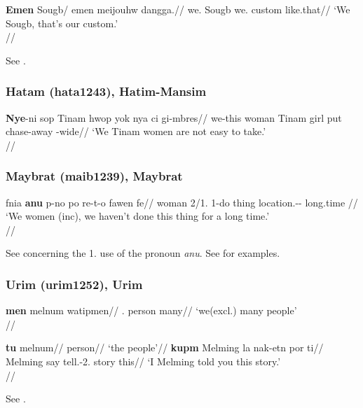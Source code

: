 \documentclass[A4paper]{article}
\begin{document}
\ex 
\begingl
\gla \textbf{Emen} Sougb/ emen meijouhw dangga.//
\glb we.\Excl{} Sougb we.\Excl{} custom like.that//
\glft `We Sougb, that's our custom.' \\\citep[274, (40)]{reesink2002sougb}//
\endgl
\xe 

See \citet[200, 269f., 274]{reesink2002sougb}.

\subsubsection{Hatam (hata1243), Hatim-Mansim}

\ex \begingl
\gla \textbf{Nye}-ni sop Tinam hwop yok nya ci gi-mbres//
\glb we-this woman Tinam girl put \Pl{} chase-away \Nmlz{}-wide//
\glft `We Tinam women are not easy to take.'\\\citep[195, (72)]{reesink1999}//
\endgl
\xe 


\subsubsection{Maybrat (maib1239), Maybrat}

\ex
\begingl
\gla fnia \textbf{anu} p-no po re-t-o fawen fe//
\glb woman 2\Pl/1\Pl.\Incl{} 1\Pl-do thing location.\Spec-\Prox-\Unmark{} long.time \Neg{}//
\glft `We women (inc), we haven't done this thing for a long time.'\\\citep[158, (99)]{dol2007}//
\endgl
\xe

See \citet[64, fn. 5]{dol2007} concerning the 1\Pl.\Incl{} use of the pronoun \emph{anu}.
See \citet[141, 158, 172, (281)]{dol2007} for examples.

\subsubsection{Urim (urim1252), Urim}

\ex \begingl
\gla \textbf{men} melnum watipmen//
\Pl.\Excl{} person many//
\glft `we(excl.) many people'\\
\citep[123]{hemmilaeluoma1987}//
\endgl
\xe 

\pex
\a
\begingl
\gla \textbf{tu} melnum//
\Pl{} person//
\glft `the people'//
\endgl
\a \begingl
\gla \textbf{kupm} Melming la nak-etn por ti//
\Sg{} Melming say tell.\Real{}-2\Sg.\Obj{} story this//
\glft `I Melming told you this story.'\\
\citep[125]{hemmilaeluoma1987}//
\endgl
\xe

See \citet[123, 125]{hemmilaeluoma1987}.
\end{document}
